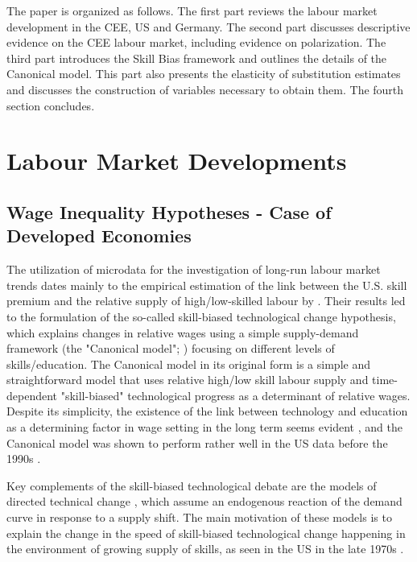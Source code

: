 \documentclass[11pt]{article}
\begin{document}
The paper is organized as follows. The first part reviews the labour market development in the CEE, US and Germany. The second part discusses descriptive evidence on the CEE labour market, including evidence on polarization. The third part introduces the Skill Bias framework and outlines the details of the Canonical model. This part also presents the elasticity of substitution estimates and discusses the construction of variables necessary to obtain them. The fourth section concludes.

\section{Labour Market Developments}
\subsection{Wage Inequality Hypotheses - Case of Developed Economies}

The utilization of microdata for the investigation of long-run labour market trends dates mainly to the empirical estimation of the link between the U.S. skill premium and the relative supply of high/low-skilled labour by \citet{katz1992changes}. Their results led to the formulation of the so-called skill-biased technological change hypothesis, which explains changes in relative wages using a simple supply-demand framework (the "Canonical model"; \citealt{acemoglu2012does}) focusing on different levels of skills/education. The Canonical model in its original form is a simple and straightforward model that uses relative high/low skill labour supply and time-dependent "skill-biased" technological progress as a determinant of relative wages. Despite its simplicity, the existence of the link between technology and education as a determining factor in wage setting in the long term seems evident \citep{piketty2018capital}, and the Canonical model was shown to perform rather well in the US data before the 1990s \citep{katz1992changes}.

Key complements of the skill-biased technological debate are the models of directed technical change \citep{acemoglu2002directed, acemoglu2002technical}, which assume an endogenous reaction of the demand curve in response to a supply shift. The main motivation of these models is to explain the change in the speed of skill-biased technological change happening in the environment of growing supply of skills, as seen in the US in the late 1970s \citep{acemoglu2002directed}.
\end{document}
